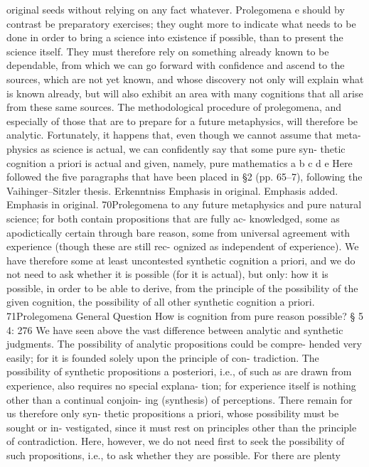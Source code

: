 original seeds without relying on any fact whatever. Prolegomena e should
by contrast be preparatory exercises; they ought more to indicate what
needs to be done in order to bring a science into existence if possible,
than to present the science itself. They must therefore rely on something
already known to be dependable, from which we can go forward with
conﬁdence and ascend to the sources, which are not yet known, and
whose discovery not only will explain what is known already, but will
also exhibit an area with many cognitions that all arise from these same
sources. The methodological procedure of prolegomena, and especially
of those that are to prepare for a future metaphysics, will therefore be
analytic.
Fortunately, it happens that, even though we cannot assume that meta-
physics as science is actual, we can conﬁdently say that some pure syn-
thetic cognition a priori is actual and given, namely, pure mathematics
a
b
c
d
e
Here followed the ﬁve paragraphs that have been placed in §2 (pp. 65–7), following the
Vaihinger–Sitzler thesis.
Erkenntniss
Emphasis in original.
Emphasis added.
Emphasis in original.
70Prolegomena to any future metaphysics
and pure natural science; for both contain propositions that are fully ac-
knowledged, some as apodictically certain through bare reason, some
from universal agreement with experience (though these are still rec-
ognized as independent of experience). We have therefore some at least
uncontested synthetic cognition a priori, and we do not need to ask whether
it is possible (for it is actual), but only: how it is possible, in order to be able
to derive, from the principle of the possibility of the given cognition, the
possibility of all other synthetic cognition a priori.
71Prolegomena
General Question
How is cognition from pure
reason possible?
§ 5
4: 276
We have seen above the vast difference between analytic and synthetic
judgments. The possibility of analytic propositions could be compre-
hended very easily; for it is founded solely upon the principle of con-
tradiction. The possibility of synthetic propositions a posteriori, i.e., of
such as are drawn from experience, also requires no special explana-
tion; for experience itself is nothing other than a continual conjoin-
ing (synthesis) of perceptions. There remain for us therefore only syn-
thetic propositions a priori, whose possibility must be sought or in-
vestigated, since it must rest on principles other than the principle of
contradiction.
Here, however, we do not need ﬁrst to seek the possibility of such
propositions, i.e., to ask whether they are possible. For there are plenty
